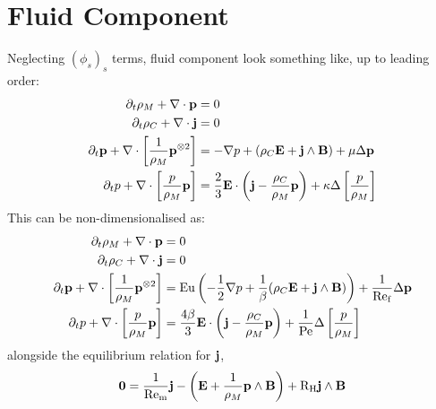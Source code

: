 \chapter{Fluid Component}

    Neglecting $(\phi_{s})_{s}$ terms, fluid component look something like, up to leading order: 
    \begin{align}
        \partial_{t}\rho_{M} + \nabla\cdot\mathbf{p}  &=  0  \\
        \partial_{t}\rho_{C} + \nabla\cdot\mathbf{j}  &=  0  \\
        \partial_{t}\mathbf{p} + \nabla\cdot\left[\frac{1}{\rho_{M}}\mathbf{p}^{\otimes 2}\right]  &=  - \nabla p + (\rho_{C}\mathbf{E} + \mathbf{j}\wedge\mathbf{B}) + \mu\Delta\mathbf{p}  \\
        \partial_{t}p + \nabla\cdot\left[\frac{p}{\rho_{M}}\mathbf{p}\right]  &=  \frac{2}{3}\mathbf{E}\cdot\left(\mathbf{j} - \frac{\rho_{C}}{\rho_{M}}\mathbf{p}\right) + \kappa\Delta\left[\frac{p}{\rho_{M}}\right]
    \end{align}
    This can be non-dimensionalised  as:
    \begin{align}
        \partial_{t}\rho_{M} + \nabla\cdot\mathbf{p}  &=  0  \\
        \partial_{t}\rho_{C} + \nabla\cdot\mathbf{j}  &=  0  \\
        \partial_{t}\mathbf{p} + \nabla\cdot\left[\frac{1}{\rho_{M}}\mathbf{p}^{\otimes 2}\right]  &=  \mathrm{Eu}\left(- \frac{1}{2}\nabla p + \frac{1}{\beta}(\rho_{C}\mathbf{E} + \mathbf{j}\wedge\mathbf{B})\right) + \frac{1}{\mathrm{Re}_{\mathrm{f}}}\Delta\mathbf{p}  \\
        \partial_{t}p + \nabla\cdot\left[\frac{p}{\rho_{M}}\mathbf{p}\right]  &=  \frac{4\beta}{3}\mathbf{E}\cdot\left(\mathbf{j} - \frac{\rho_{C}}{\rho_{M}}\mathbf{p}\right) + \frac{1}{\mathrm{Pe}}\Delta\left[\frac{p}{\rho_{M}}\right]
    \end{align}
    alongside the equilibrium relation for $\mathbf{j}$,
    \begin{equation}\label{eqn:current identity}
        \mathbf{0}  =  \frac{1}{\mathrm{Re}_{\mathrm{m}}}\mathbf{j} - \left(\mathbf{E} + \frac{1}{\rho_{M}}\mathbf{p}\wedge\mathbf{B}\right) + \mathrm{R}_{\mathrm{H}}\mathbf{j}\wedge\mathbf{B}
    \end{equation}
